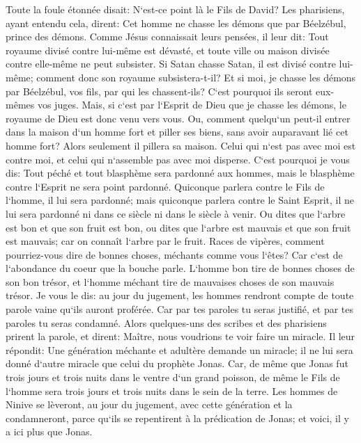 \verse Toute la foule étonnée disait: N`est-ce point là le Fils de David? 
\verse Les pharisiens, ayant entendu cela, dirent: Cet homme ne chasse les démons que par Béelzébul, prince des démons. 
\verse Comme Jésus connaissait leurs pensées, il leur dit: Tout royaume divisé contre lui-même est dévasté, et toute ville ou maison divisée contre elle-même ne peut subsister. 
\verse Si Satan chasse Satan, il est divisé contre lui-même; comment donc son royaume subsistera-t-il? 
\verse Et si moi, je chasse les démons par Béelzébul, vos fils, par qui les chassent-ils? C`est pourquoi ils seront eux-mêmes vos juges. 
\verse Mais, si c`est par l`Esprit de Dieu que je chasse les démons, le royaume de Dieu est donc venu vers vous. 
\verse Ou, comment quelqu`un peut-il entrer dans la maison d`un homme fort et piller ses biens, sans avoir auparavant lié cet homme fort? Alors seulement il pillera sa maison. 
\verse Celui qui n`est pas avec moi est contre moi, et celui qui n`assemble pas avec moi disperse. 
\verse C`est pourquoi je vous dis: Tout péché et tout blasphème sera pardonné aux hommes, mais le blasphème contre l`Esprit ne sera point pardonné. 
\verse Quiconque parlera contre le Fils de l`homme, il lui sera pardonné; mais quiconque parlera contre le Saint Esprit, il ne lui sera pardonné ni dans ce siècle ni dans le siècle à venir. 
\verse Ou dites que l`arbre est bon et que son fruit est bon, ou dites que l`arbre est mauvais et que son fruit est mauvais; car on connaît l`arbre par le fruit. 
\verse Races de vipères, comment pourriez-vous dire de bonnes choses, méchants comme vous l`êtes? Car c`est de l`abondance du coeur que la bouche parle. 
\verse L`homme bon tire de bonnes choses de son bon trésor, et l`homme méchant tire de mauvaises choses de son mauvais trésor. 
\verse Je vous le dis: au jour du jugement, les hommes rendront compte de toute parole vaine qu`ils auront proférée. 
\verse Car par tes paroles tu seras justifié, et par tes paroles tu seras condamné. 
\verse Alors quelques-uns des scribes et des pharisiens prirent la parole, et dirent: Maître, nous voudrions te voir faire un miracle. 
\verse Il leur répondit: Une génération méchante et adultère demande un miracle; il ne lui sera donné d`autre miracle que celui du prophète Jonas. 
\verse Car, de même que Jonas fut trois jours et trois nuits dans le ventre d`un grand poisson, de même le Fils de l`homme sera trois jours et trois nuits dans le sein de la terre. 
\verse Les hommes de Ninive se lèveront, au jour du jugement, avec cette génération et la condamneront, parce qu`ils se repentirent à la prédication de Jonas; et voici, il y a ici plus que Jonas. 

